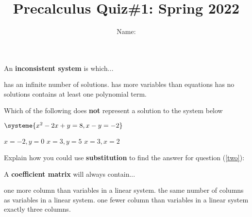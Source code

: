 \documentclass{exam}
\title{Precalculus Quiz\#1: Spring 2022  }
\author{  Name:   }
\begin{document}
\maketitle
\thispagestyle{empty}

\begin{questions}
\question 

\begin{multicols}{2}
An \textbf{inconsistent system} is  which... 

\columnbreak
\begin{choices}
\choice has an infinite number of solutions.
\choice has more variables than equations
\choice has no solutions
\choice contains at least one polynomial term.
\end{choices}

\end{multicols}

\question 
\label{two}
\begin{multicols}{2}
Which of the following does \textbf{not} represent a solution to the system below

$
\systeme{
x^2 -2x + y = 8,
x - y = -2
}
$

\begin{choices}
\choice  $x = -2, y = 0$
\choice $x = 3, y = 5$
\choice $x = 3, x = 2 $
\end{choices}
\end{multicols}

\question Explain how you could use \textbf{substitution} to find the answer for question (\ref{two}):

\makeemptybox{2in}
\question
\begin{multicols}{2}
A \textbf{coefficient matrix} will always contain...

\columnbreak

\begin{choices}
\choice one more column than variables in a linear system.
\choice the same number of columns as variables in a linear system.
\choice one fewer column than variables in a linear system
\choice  exactly three columns.
\end{choices}
\end{multicols}

\question


\end{questions}
\end{document}
